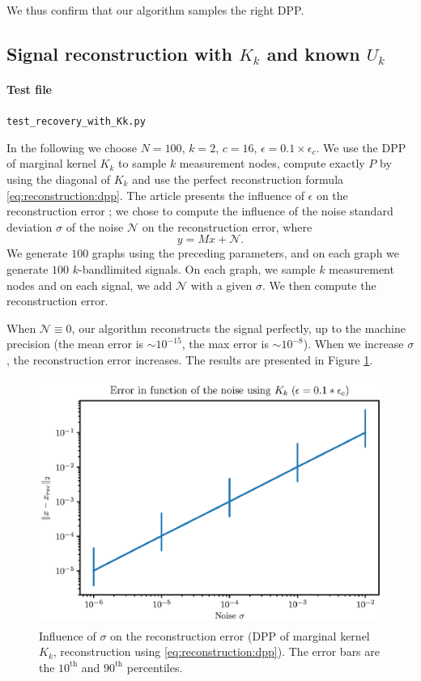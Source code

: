 \documentclass{article}
\begin{document}
We thus confirm that our algorithm samples the right DPP.

\subsection[Signal reconstruction with Kk qnd known Uk]{Signal reconstruction with $K_k$ and known $U_k$}


\paragraph{Test file} \verb#test_recovery_with_Kk.py#


In the following we choose $N=100$, $k=2$, $c=16$, $\epsilon = 0.1 \times \epsilon_c$. We use the DPP of marginal kernel $K_k$ to sample $k$ measurement nodes, compute exactly $P$ by using the diagonal of $K_k$ and use the perfect reconstruction formula \eqref{eq:reconstruction:dpp}. The article presents the influence of $\epsilon$ on the reconstruction error ; we chose to compute the influence of the noise standard deviation $\sigma$ of the noise $\mathcal{N}$ on the reconstruction error, where
\[ y = Mx + \mathcal{N}. \] 
We generate $100$ graphs using the preceding parameters, and on each graph we generate $100$ $k$-bandlimited signals. On each graph, we sample $k$ measurement nodes and on each signal, we add $\mathcal{N}$ with a given $\sigma$. We then compute the reconstruction error.


When $\mathcal{N} \equiv 0$, our algorithm reconstructs the signal perfectly, up to the machine precision (the mean error is $\sim 10^{-15}$, the max error is $\sim 10^{-8}$). When we increase $\sigma$, the reconstruction error increases. The results are presented in Figure \ref{fig:Kk:recerror}.


\begin{figure}[ht]
\centering
\includegraphics[height=8cm]{error_function_noise_Kk.eps}
\caption{Influence of $\sigma$ on the reconstruction error (DPP of marginal kernel $K_k$, reconstruction using \eqref{eq:reconstruction:dpp}). The error bars are the $10^\text{th}$ and $90^\text{th}$ percentiles.} \label{fig:Kk:recerror}
\end{figure}
\end{document}
